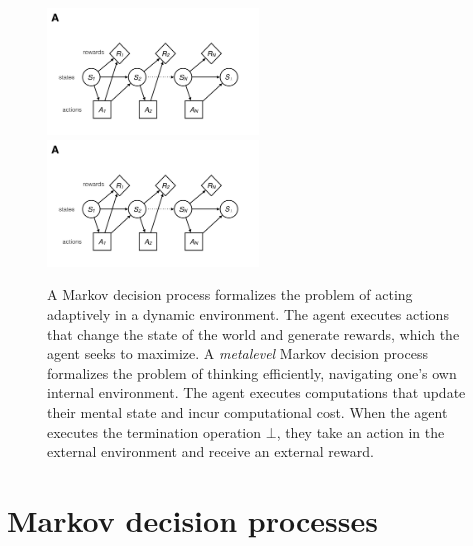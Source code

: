 

\begin{figure}
  \includegraphics[width=0.5\textwidth,page=1,trim=0 100 150 50]{diagrams/metamdp.pdf}
  \includegraphics[width=0.5\textwidth,page=2,trim=0 100 150 50]{diagrams/metamdp.pdf}
  \caption{
   A Markov decision process formalizes the problem of acting adaptively in a dynamic environment. The agent executes actions that change the state of the world and generate rewards, which the agent seeks to maximize.
   A \emph{metalevel} Markov decision process formalizes the problem of thinking efficiently, navigating one's own internal environment. The agent executes computations that update their mental state and incur computational cost. When the agent executes the termination operation $\bot$, they take an action in the external environment and receive an external reward.}
  \label{fig:metamdp-diagram}
\end{figure}


\section{Markov decision processes}

